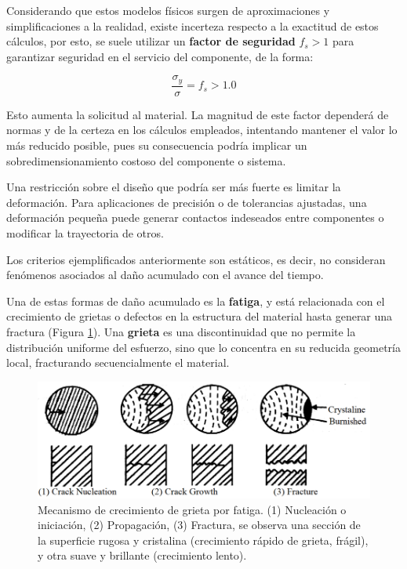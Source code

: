 Considerando que estos modelos físicos surgen de aproximaciones y simplificaciones a la realidad, existe incerteza respecto a la exactitud de estos cálculos, por esto, se suele utilizar un \textbf{factor de seguridad} $f_{s}>1$ para garantizar seguridad en el servicio del componente, de la forma:

\begin{equation}
   \frac{\sigma_{y}}{\sigma} = f_{s}>1.0
\end{equation}

Esto aumenta la solicitud al material. La magnitud de este factor dependerá de normas y de la certeza en los cálculos empleados, intentando mantener el valor lo más reducido posible, pues su consecuencia podría implicar un sobredimensionamiento costoso del componente o sistema.

Una restricción sobre el diseño que podría ser más fuerte es limitar la deformación. Para aplicaciones de precisión o de tolerancias ajustadas, una deformación pequeña puede generar contactos indeseados entre componentes o modificar la trayectoria de otros.

Los criterios ejemplificados anteriormente son estáticos, es decir, no consideran fenómenos asociados al daño acumulado con el avance del tiempo.

Una de estas formas de daño acumulado es la \textbf{fatiga}, y está relacionada con el crecimiento de grietas o defectos en la estructura del material hasta generar una fractura (Figura \ref{crack}). Una \textbf{grieta} es una discontinuidad que no permite la distribución uniforme del esfuerzo, sino que lo concentra en su reducida geometría local, fracturando secuencialmente el material.

\begin{figure}[h!]
    \centering
    \includegraphics[width=0.9\linewidth]{imgs/crack.png}
    \caption{Mecanismo de crecimiento de grieta por fatiga. (1) Nucleación o iniciación, (2) Propagación, (3) Fractura, se observa una sección de la superficie rugosa y cristalina (crecimiento rápido de grieta, frágil), y otra suave y brillante (crecimiento lento).}
    \label{crack}
\end{figure}

